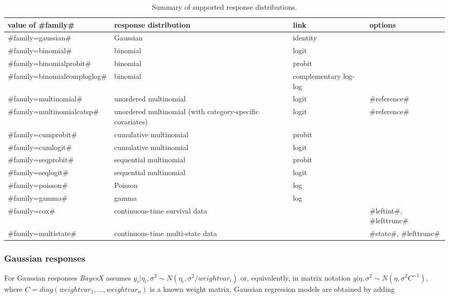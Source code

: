 \begin{table}[ht]
\begin{center}
\begin{tabular} {|l|p{5cm}|p{2.7cm}|p{1.7cm}|}
 \hline
 value of #family# & response distribution & link & options\\
 \hline
 \hline
 #family=gaussian#            & Gaussian              & identity & \\
 \hline
 #family=binomial#            & binomial              & logit & \\
 #family=binomialprobit#      & binomial              & probit & \\
 #family=binomialcomploglog#      & binomial              & complementary log-log & \\
 \hline
 #family=multinomial#         & unordered multinomial & logit & #reference#\\
 #family=multinomialcatsp#    & unordered multinomial (with category-specific covariates) & logit & #reference#\\
 \hline
 #family=cumprobit#           & cumulative multinomial   & probit & \\
 #family=cumlogit#            & cumulative multinomial   & logit & \\
 \hline
 #family=seqprobit#           & sequential multinomial   & probit & \\
 #family=seqlogit#            & sequential multinomial   & logit & \\
 \hline
 #family=poisson#             & Poisson               & log & \\
 \hline
 #family=gamma#               & gamma                 & log & \\
 \hline
 #family=cox#                 & continuous-time survival data & & #leftint#, #lefttrunc#\\
 \hline
 #family=multistate#                 & continuous-time multi-state data & & #state#, #lefttrunc#\\
 \hline
\end{tabular}
{\em \caption {\label{remlregfamilyopt} Summary of supported
response distributions.}}
\end{center}
\end{table}

\subsubsection*{Gaussian responses}

For Gaussian responses {\em BayesX} assumes $y_i | \eta_i,\sigma^2
\sim N(\eta_i,\sigma^2/weightvar_i)$ or, equivalently, in matrix
notation $y | \eta, \sigma^2 \sim N(\eta,\sigma^2C^{-1})$, where
$C=diag(weightvar_1,\dots,weightvar_n)$ is a known weight matrix.
Gaussian regression models are obtained by adding

